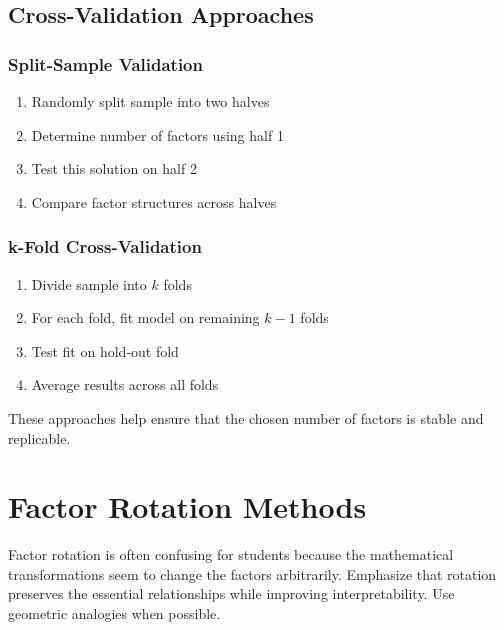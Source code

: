 \documentclass[a4paper]{tufte-book}
\begin{document}
\section{Cross-Validation Approaches}

\subsection{Split-Sample Validation}

\begin{enumerate}
\item Randomly split sample into two halves
\item Determine number of factors using half 1
\item Test this solution on half 2
\item Compare factor structures across halves
\end{enumerate}

\subsection{k-Fold Cross-Validation}

\begin{enumerate}
\item Divide sample into $k$ folds
\item For each fold, fit model on remaining $k-1$ folds
\item Test fit on hold-out fold
\item Average results across all folds
\end{enumerate}

These approaches help ensure that the chosen number of factors is stable and replicable.


\chapter{Factor Rotation Methods}

\begin{pedagogicalnote}
Factor rotation is often confusing for students because the mathematical transformations seem to change the factors arbitrarily. Emphasize that rotation preserves the essential relationships while improving interpretability. Use geometric analogies when possible.
\end{pedagogicalnote}
\end{document}
